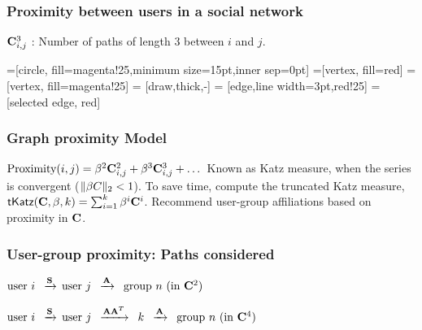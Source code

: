 \documentclass{beamer}
\begin{document}
\begin{frame}
\frametitle{Proximity between users in a social network}
$\mathbf{C}^{3}_{i,j}$ : Number of paths of length 3 between $i$ and $j$.

=[circle, fill=magenta!25,minimum size=15pt,inner sep=0pt]
=[vertex, fill=red]
=[vertex, fill=magenta!25]
 = [draw,thick,-]
 = [edge,line width=3pt,red!25]
 = [selected edge, red]

\begin{center}
\end{center}
\end{frame}

\begin{frame}
\frametitle{Graph proximity Model}
\begin{itemize}
\pitem $\text{Proximity}(i, j) = \beta^{2} \mathbf{C}^{2}_{i,j} + \beta^{3}\mathbf{C}^3_{i,j} + \dots$
\pitem Known as Katz measure, when the series is convergent ($\|\beta C \|_{2} < 1$).
\pitem To save time, compute the truncated Katz measure, $\textsf{tKatz}(\mathbf{C}, \beta, k) = \sum_{i=1}^{k} \beta^i \mathbf{C}^i$.
\pitem Recommend user-group affiliations based on proximity in $\mathbf{C}$.
\end{itemize}
\end{frame}

\begin{frame}
\frametitle{User-group proximity: Paths considered}
\begin{itemize}
\pitem $
\text{user $i$ } \, \xrightarrow{\mathbf{S}}\, \text{user $j$ } \,\xrightarrow{\mathbf{A}} \, \text{ group $n$ (in $\mathbf{C}^2$)}$

\pitem $
\text{user $i$ } \, \xrightarrow{\mathbf{S}} \, \text{user $j$ } \, \xrightarrow{\mathbf{A}\mathbf{A}^T} \, \text{ $k$ }\, \xrightarrow{\mathbf{A}}\, \text{ group $n$ (in $\mathbf{C}^4$)}$
\end{itemize}
\end{frame}
\end{document}
